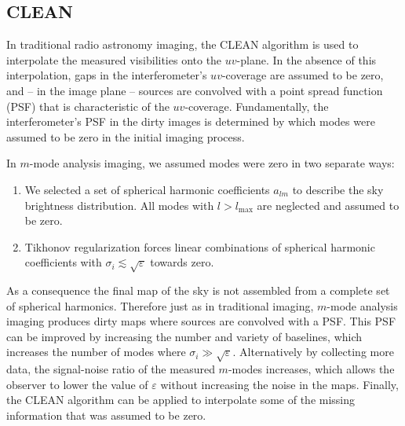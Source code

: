 \documentclass[twocolumn]{aastex61}
\begin{document}
\subsection{CLEAN}\label{sec:clean}

In traditional radio astronomy imaging, the CLEAN algorithm \citep{1974A&AS...15..417H} is used to
interpolate the measured visibilities onto the $uv$-plane. In the absence of this interpolation,
gaps in the interferometer's $uv$-coverage are assumed to be zero, and -- in the image plane --
sources are convolved with a point spread function (PSF) that is characteristic of the
$uv$-coverage.  Fundamentally, the interferometer's PSF in the dirty images is determined by which
modes were assumed to be zero in the initial imaging process.

In $m$-mode analysis imaging, we assumed modes were zero in two separate ways:
\begin{enumerate}
    \item We selected a set of spherical harmonic coefficients $a_{lm}$ to describe the sky
        brightness distribution. All modes with $l>l_\text{max}$ are neglected and assumed to be
        zero.
    \item Tikhonov regularization forces linear combinations of spherical harmonic coefficients with
        $\sigma_i \lesssim \sqrt{\varepsilon}$ towards zero.
\end{enumerate}
As a consequence the final map of the sky is not assembled from a complete set of spherical
harmonics. Therefore just as in traditional imaging, $m$-mode analysis imaging produces dirty maps
where sources are convolved with a PSF.  This PSF can be improved by increasing the number and
variety of baselines, which increases the number of modes where $\sigma_i \gg \sqrt{\varepsilon}$.
Alternatively by collecting more data, the signal-noise ratio of the measured $m$-modes increases,
which allows the observer to lower the value of $\varepsilon$ without increasing the noise in the
maps.  Finally, the CLEAN algorithm can be applied to interpolate some of the missing information
that was assumed to be zero.
\end{document}
